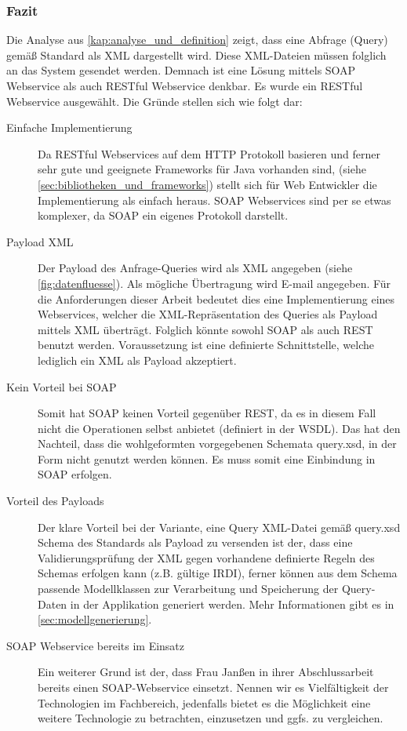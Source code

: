 \subsubsection{Fazit}
Die Analyse aus \autoref{kap:analyse_und_definition} zeigt, dass eine Abfrage (Query) gemäß Standard als XML dargestellt wird. Diese XML-Dateien müssen folglich an das System gesendet werden. Demnach ist eine Lösung mittels \gls{SOAP} \gls{Webservice} als auch \gls{REST}ful \gls{Webservice} denkbar. 
Es wurde ein \gls{REST}ful \gls{Webservice} ausgewählt. Die Gründe stellen sich wie folgt dar:

\begin{description}
\item[Einfache Implementierung] Da \gls{REST}ful Webservices auf dem \gls{HTTP} Protokoll basieren und ferner sehr gute und geeignete Frameworks für Java vorhanden sind, (siehe \autoref{sec:bibliotheken_und_frameworks}) stellt sich für Web Entwickler die Implementierung als einfach heraus. \gls{SOAP} \glspl{Webservice} sind per se etwas komplexer, da \gls{SOAP} ein eigenes Protokoll darstellt. 
\item[Payload XML] Der Payload des Anfrage-Queries wird als XML angegeben (siehe \autoref{fig:datenfluesse}). Als mögliche Übertragung wird E-mail angegeben. Für die Anforderungen dieser Arbeit bedeutet dies eine Implementierung eines \glspl{Webservice}, welcher die XML-Repräsentation des Queries als Payload mittels XML überträgt. Folglich könnte sowohl \gls{SOAP} als auch \gls{REST} benutzt werden. Voraussetzung ist eine definierte Schnittstelle, welche lediglich ein XML als Payload akzeptiert. 
\item[Kein Vorteil bei SOAP] Somit hat \gls{SOAP} keinen Vorteil gegenüber \gls{REST}, da es in diesem Fall nicht die Operationen selbst anbietet (definiert in der \gls{WSDL}). Das hat den Nachteil, dass die wohlgeformten vorgegebenen Schemata query.xsd, in der Form nicht genutzt werden können. Es muss somit eine Einbindung in \gls{SOAP} erfolgen.
 \item[Vorteil des Payloads] Der klare Vorteil bei der Variante, eine Query XML-Datei gemäß query.xsd Schema des Standards als Payload zu versenden ist der, dass eine Validierungsprüfung der XML gegen vorhandene definierte Regeln des Schemas erfolgen kann (z.B. gültige \gls{IRDI}), ferner können aus dem Schema passende Modellklassen zur Verarbeitung und Speicherung der Query-Daten in der Applikation generiert werden. Mehr Informationen gibt es in \autoref{sec:modellgenerierung}. 
\item[SOAP Webservice bereits im Einsatz] Ein weiterer Grund ist der, dass Frau Janßen in ihrer Abschlussarbeit bereits einen SOAP-Webservice einsetzt. Nennen wir es Vielfältigkeit der Technologien im Fachbereich, jedenfalls bietet es die Möglichkeit eine weitere Technologie zu betrachten, einzusetzen und ggfs. zu vergleichen. 
\end{description}

